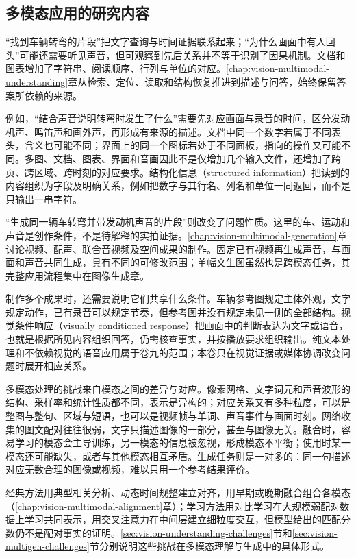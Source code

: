 \subsection{多模态应用的研究内容}
\label{sec:vision-overview-multimodal-tasks}

“找到车辆转弯的片段”把文字查询与时间证据联系起来；“为什么画面中有人回头”可能还需要听见声音，但可观察到先后关系并不等于识别了因果机制。文档和图表增加了字符串、阅读顺序、行列与单位的对应。\ref{chap:vision-multimodal-understanding}章从检索、定位、读取和结构恢复推进到描述与问答，始终保留答案所依赖的来源。

例如，“结合声音说明转弯时发生了什么”需要先对应画面与录音的时间，区分发动机声、鸣笛声和画外声，再形成有来源的描述。文档中同一个数字若属于不同表头，含义也可能不同；界面上的同一个图标若处于不同面板，指向的操作又可能不同。多图、文档、图表、界面和音画因此不是仅增加几个输入文件，还增加了跨页、跨区域、跨时刻的对应要求。结构化信息（structured information）把读到的内容组织为字段及明确关系，例如把数字与其行名、列名和单位一同返回，而不是只输出一串字符。

“生成同一辆车转弯并带发动机声音的片段”则改变了问题性质。这里的车、运动和声音是创作条件，不是待解释的实拍证据。\ref{chap:vision-multimodal-generation}章讨论视频、配声、联合音视频及空间成果的制作。固定已有视频再生成声音，与画面和声音共同生成，具有不同的可修改范围；单幅文生图虽然也是跨模态任务，其完整应用流程集中在图像生成章。

制作多个成果时，还需要说明它们共享什么条件。车辆参考图规定主体外观，文字规定动作，已有录音可以规定节奏，但参考图并没有规定未见一侧的全部结构。视觉条件响应（visually conditioned response）把画面中的判断表达为文字或语音，也就是根据所见内容组织回答，仍需核查事实，并按播放要求组织输出。纯文本处理和不依赖视觉的语音应用属于卷九的范围；本卷只在视觉证据或媒体协调改变问题时展开相应关系。

多模态处理的挑战来自模态之间的差异与对应。像素网格、文字词元和声音波形的结构、采样率和统计性质都不同，表示是异构的；对应关系又有多种粒度，可以是整图与整句、区域与短语，也可以是视频帧与单词、声音事件与画面时刻。网络收集的图文配对往往很弱，文字只描述图像的一部分，甚至与图像无关。融合时，容易学习的模态会主导训练，另一模态的信息被忽视，形成模态不平衡；使用时某一模态还可能缺失，或者与其他模态相互矛盾。生成任务则是一对多的：同一句描述对应无数合理的图像或视频，难以只用一个参考结果评价。

经典方法用典型相关分析、动态时间规整建立对齐，用早期或晚期融合组合各模态（\ref{chap:vision-multimodal-alignment}章）；学习方法用对比学习在大规模弱配对数据上学习共同表示，用交叉注意力在中间层建立细粒度交互，但模型给出的匹配分数仍不是配对事实的证明。\ref{sec:vision-understanding-challenges}节和\ref{sec:vision-multigen-challenges}节分别说明这些挑战在多模态理解与生成中的具体形式。

